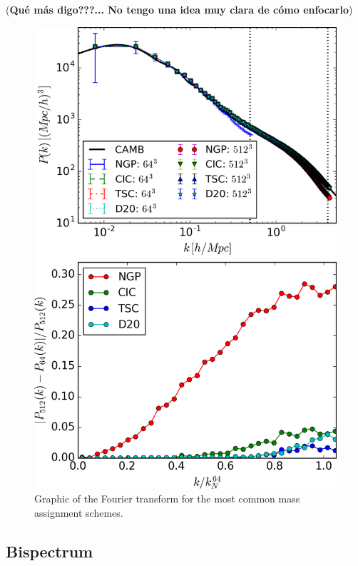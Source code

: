 \documentclass[a4paper,fleqn,usenatbib]{mnras}
\begin{document}
(\textbf{Qu\'e m\'as digo???... No tengo una idea muy clara de c\'omo enfocarlo})

\begin{figure}
  \centering
  \includegraphics[width=0.95\columnwidth]{images/PowerSpectrumComparison.png}
  \caption{Graphic of the Fourier transform for the most common mass assignment schemes.}
  \label{fig:PvsCAMB}
\end{figure}




\subsection{Bispectrum}
\label{sec:results:bk}
\end{document}
